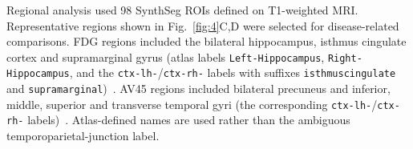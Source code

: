 Regional analysis used 98 SynthSeg ROIs defined on T1-weighted MRI. Representative regions shown in Fig.~\ref{fig:4}C,D were selected for disease-related comparisons. FDG regions included the bilateral hippocampus, isthmus cingulate cortex and supramarginal gyrus (atlas labels \texttt{Left-Hippocampus}, \texttt{Right-Hippocampus}, and the \texttt{ctx-lh-}/\texttt{ctx-rh-} labels with suffixes \texttt{isthmuscingulate} and \texttt{supramarginal})~\cite{mosconi2005reduced,he2015meta,strom2022cortical}. AV45 regions included bilateral precuneus and inferior, middle, superior and transverse temporal gyri (the corresponding \texttt{ctx-lh-}/\texttt{ctx-rh-} labels)~\cite{wong2010in}. Atlas-defined names are used rather than the ambiguous temporoparietal-junction label.
